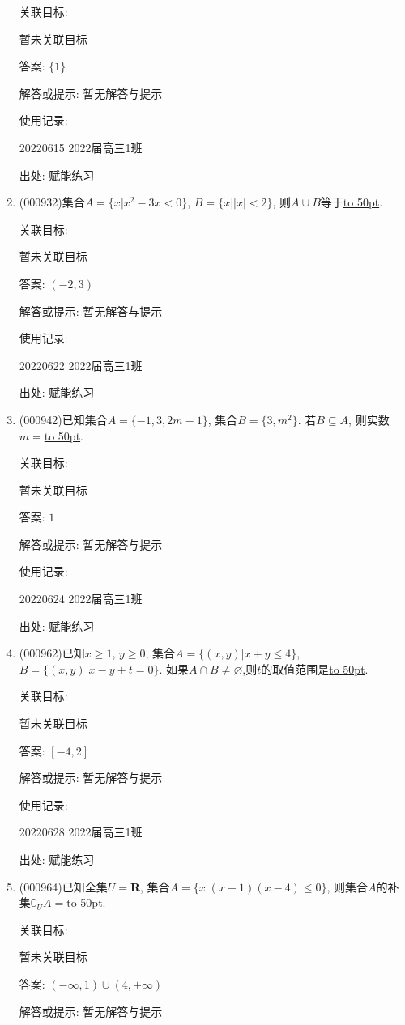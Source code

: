 \documentclass[10pt,a4paper]{article}
\newcommand{\blank}[1]{\underline{\hbox to #1pt{}}}
\begin{document}
\begin{enumerate}[1.]
关联目标:

暂未关联目标

答案: $\{1\}$

解答或提示: 暂无解答与提示

使用记录:

20220615	2022届高三1班	


出处: 赋能练习
\item { (000932)}集合$A=\{x|x^2-3x<0\}$, $B=\{x||x|<2\}$, 则$A\cup B$等于\blank{50}.


关联目标:

暂未关联目标

答案: $(-2,3)$

解答或提示: 暂无解答与提示

使用记录:

20220622	2022届高三1班	


出处: 赋能练习
\item { (000942)}已知集合$A=\{-1,3,2m-1\}$, 集合$B=\{3,m^2\}$. 若$B\subseteq A$, 则实数$m=$\blank{50}.


关联目标:

暂未关联目标

答案: $1$

解答或提示: 暂无解答与提示

使用记录:

20220624	2022届高三1班	


出处: 赋能练习
\item { (000962)}已知$x\ge 1$, $y\ge 0$, 集合$A=\{(x,y)|x+y\le 4\}$, $B=\{(x,y)|x-y+t=0\}$. 如果$A\cap B\ne \varnothing$,则$t$的取值范围是\blank{50}.


关联目标:

暂未关联目标

答案: $[-4,2]$

解答或提示: 暂无解答与提示

使用记录:

20220628	2022届高三1班	


出处: 赋能练习
\item { (000964)}已知全集$U=\mathbf{R}$, 集合$A=\{x|(x-1)(x-4)\le 0\}$, 则集合$A$的补集$\complement_UA=$\blank{50}.


关联目标:

暂未关联目标

答案: $(-\infty ,1)\cup (4,+\infty)$

解答或提示: 暂无解答与提示


\end{enumerate}
\end{document}
